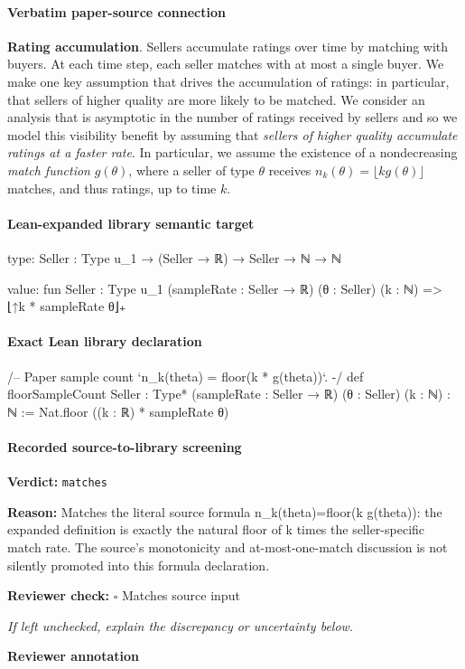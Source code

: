 \documentclass[10pt]{article}
\newcommand{\reviewerbox}{%
  \par\noindent\fbox{\parbox{0.96\linewidth}{\rule{0pt}{0.38in}}}\par
}
\newcommand{\reviewmatch}[1]{%
  \par\noindent\textbf{Reviewer check:} $\square$\; #1\par
  \noindent\emph{If left unchecked, explain the discrepancy or uncertainty below.}\par
}
\begin{document}
\paragraph{Verbatim paper-source connection}
\begin{ReviewVerbatim}
{\bf Rating accumulation}.  Sellers accumulate ratings over time by matching with buyers. At each time step, each seller matches with at most a single buyer. We make one key assumption that drives the accumulation of ratings: in particular, that sellers of higher quality are more likely to be matched. %
We consider an analysis that is asymptotic in the number of ratings received by sellers and so we model this visibility benefit by assuming that {\em sellers of higher quality accumulate ratings at a faster rate}. In particular, we assume the existence of a nondecreasing {\em match function} $g(\theta)$, where a seller of type $\theta$ receives $n_k(\theta) = \lfloor k g(\theta) \rfloor$ matches, and thus ratings, up to time $k$.
\end{ReviewVerbatim}



\paragraph{Lean-expanded library semantic target}
\begin{ReviewVerbatim}
type:
{Seller : Type u_1} → (Seller → ℝ) → Seller → ℕ → ℕ

value:
fun {Seller : Type u_1} (sampleRate : Seller → ℝ) (θ : Seller) (k : ℕ) => ⌊↑k * sampleRate θ⌋₊
\end{ReviewVerbatim}

\paragraph{Exact Lean library declaration}
\begin{ReviewVerbatim}
/-- Paper sample count `n_k(theta) = floor(k * g(theta))`. -/
def floorSampleCount {Seller : Type*} (sampleRate : Seller → ℝ)
    (θ : Seller) (k : ℕ) : ℕ :=
  Nat.floor ((k : ℝ) * sampleRate θ)
\end{ReviewVerbatim}

\paragraph{Recorded source-to-library screening}
\textbf{Verdict:} \texttt{matches}
\\
{\raggedright
\textbf{Reason:} Matches the literal source formula n\_\allowbreak{}k(theta)=floor(k g(theta)):\allowbreak{} the expanded definition is exactly the natural floor of k times the seller-\allowbreak{}specific match rate.\allowbreak{} The source's monotonicity and at-\allowbreak{}most-\allowbreak{}one-\allowbreak{}match discussion is not silently promoted into this formula declaration.\allowbreak{}
\par}
\reviewmatch{Matches source input}
\noindent\textbf{Reviewer annotation}\par
\reviewerbox
\clearpage
\hypertarget{library-prerequisite-50e0fc0c0050fdf5}{}
\end{document}
